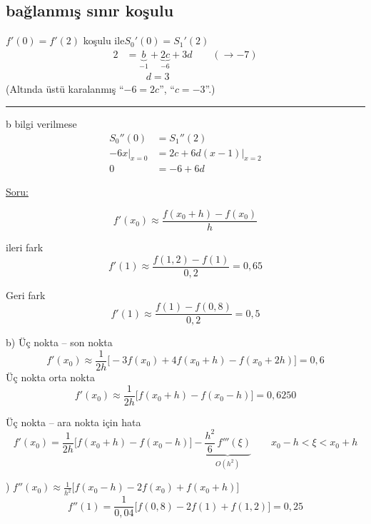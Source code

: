 \documentclass[11pt,a4paper]{article}
\begin{document}
\subsection{bağlanmış sınır koşulu}
{\small $f'(0) = f'(2)$ koşulu ile}\quad $S_0'(0) = S_1'(2)$
\begin{align*}
  2 &= \underbrace{b}_{-1} + \underbrace{2c}_{-6} + 3d \qquad (\rightarrow -7)\\
  &\qquad d = 3
\end{align*}
{\small(Altında üstü karalanmış ``$-6 = 2c$'', ``$c = -3$''.)}

\noindent\rule{0.6\linewidth}{0.4pt}

\noindent b bilgi verilmese
\begin{align*}
  S_0''(0) &= S_1''(2)\\
  -6x\Big|_{x=0} &= 2c + 6d(x-1)\Big|_{x=2}\\
  0 &= -6 + 6d
\end{align*}

\noindent\underline{Soru:}

\vspace{1cm}
\[
  f'(x_0) \approx \frac{f(x_0+h) - f(x_0)}{h}
\]
\noindent
\begin{minipage}[t]{0.48\linewidth}
ileri fark
\[
  f'(1) \approx \frac{f(1{,}2) - f(1)}{0{,}2} = 0{,}65
\]
\end{minipage}\hfill
\begin{minipage}[t]{0.48\linewidth}
Geri fark
\[
  f'(1) \approx \frac{f(1) - f(0{,}8)}{0{,}2} = 0{,}5
\]
\end{minipage}

\noindent b) Üç nokta -- son nokta
\[
  f'(x_0) \approx \frac{1}{2h}\Big[-3f(x_0) + 4f(x_0+h) - f(x_0+2h)\Big] = 0{,}6
\]
Üç nokta orta nokta
\[
  f'(x_0) \approx \frac{1}{2h}\Big[f(x_0+h) - f(x_0-h)\Big] = 0{,}6250
\]

\medskip
\noindent Üç nokta -- ara nokta için hata
\[
  f'(x_0) = \frac{1}{2h}\Big[f(x_0+h) - f(x_0-h)\Big] - \underbrace{\frac{h^2}{6}\,f'''(\xi)}_{O(h^2)}
  \qquad x_0 - h < \xi < x_0 + h
\]

\medskip
{}) \quad $\displaystyle f''(x_0) \approx \frac{1}{h^2}\Big[f(x_0-h) - 2f(x_0) + f(x_0+h)\Big]$
\[
  f''(1) = \frac{1}{0{,}04}\Big[f(0{,}8) - 2f(1) + f(1{,}2)\Big] = 0{,}25
\]
\end{document}

